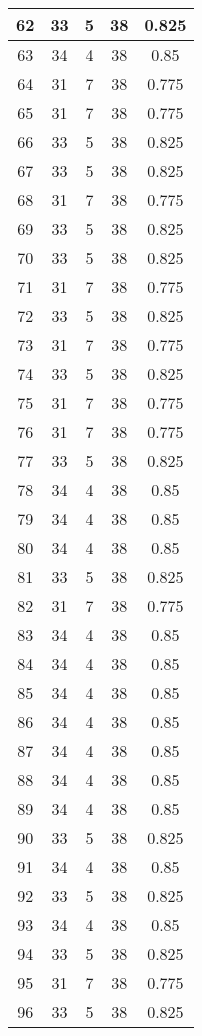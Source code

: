 \documentclass[letterpaper, 12pt]{article}
\begin{document}
\begin{longtable}{|c|c|c|c|c|}
\hline
62 & 33 & 5 & 38 & 0.825 \\
\hline
63 & 34 & 4 & 38 & 0.85 \\
\hline
64 & 31 & 7 & 38 & 0.775 \\
\hline
65 & 31 & 7 & 38 & 0.775 \\
\hline
66 & 33 & 5 & 38 & 0.825 \\
\hline
67 & 33 & 5 & 38 & 0.825 \\
\hline
68 & 31 & 7 & 38 & 0.775 \\
\hline
69 & 33 & 5 & 38 & 0.825 \\
\hline
70 & 33 & 5 & 38 & 0.825 \\
\hline
71 & 31 & 7 & 38 & 0.775 \\
\hline
72 & 33 & 5 & 38 & 0.825 \\
\hline
73 & 31 & 7 & 38 & 0.775 \\
\hline
74 & 33 & 5 & 38 & 0.825 \\
\hline
75 & 31 & 7 & 38 & 0.775 \\
\hline
76 & 31 & 7 & 38 & 0.775 \\
\hline
77 & 33 & 5 & 38 & 0.825 \\
\hline
78 & 34 & 4 & 38 & 0.85 \\
\hline
79 & 34 & 4 & 38 & 0.85 \\
\hline
80 & 34 & 4 & 38 & 0.85 \\
\hline
81 & 33 & 5 & 38 & 0.825 \\
\hline
82 & 31 & 7 & 38 & 0.775 \\
\hline
83 & 34 & 4 & 38 & 0.85 \\
\hline
84 & 34 & 4 & 38 & 0.85 \\
\hline
85 & 34 & 4 & 38 & 0.85 \\
\hline
86 & 34 & 4 & 38 & 0.85 \\
\hline
87 & 34 & 4 & 38 & 0.85 \\
\hline
88 & 34 & 4 & 38 & 0.85 \\
\hline
89 & 34 & 4 & 38 & 0.85 \\
\hline
90 & 33 & 5 & 38 & 0.825 \\
\hline
91 & 34 & 4 & 38 & 0.85 \\
\hline
92 & 33 & 5 & 38 & 0.825 \\
\hline
93 & 34 & 4 & 38 & 0.85 \\
\hline
94 & 33 & 5 & 38 & 0.825 \\
\hline
95 & 31 & 7 & 38 & 0.775 \\
\hline
96 & 33 & 5 & 38 & 0.825 \\

\end{longtable}
\end{document}
